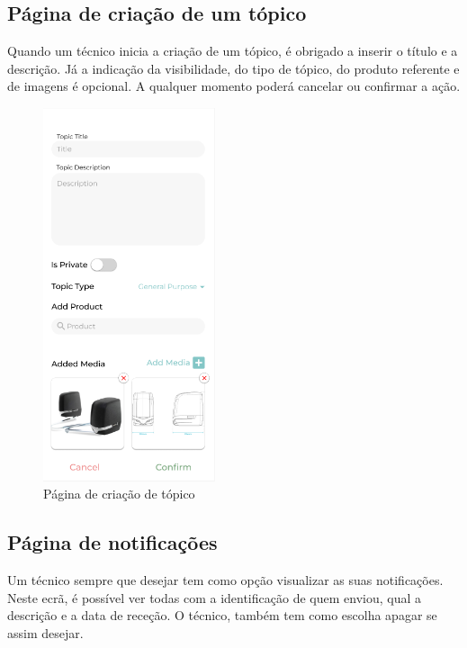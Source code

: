 \newpage

\subsection{Página de criação de um tópico}

Quando um técnico inicia a criação de um tópico, é obrigado a inserir o título e a descrição. Já a indicação da visibilidade, do tipo de tópico, do produto referente e de imagens é opcional. A qualquer momento poderá cancelar ou confirmar a ação.

\begin{figure}[htb]
    \centering
    \includegraphics[width=0.45\textwidth]{images/mockups/forum_create_topic.png}
    \caption{Página de criação de tópico}
    \label{fig:28}
\end{figure}

\newpage

\subsection{Página de notificações}

Um técnico sempre que desejar tem como opção visualizar as suas notificações. Neste ecrã, é possível ver todas com a identificação de quem enviou, qual a descrição e a data de receção. O técnico, também tem como escolha apagar se assim desejar.

